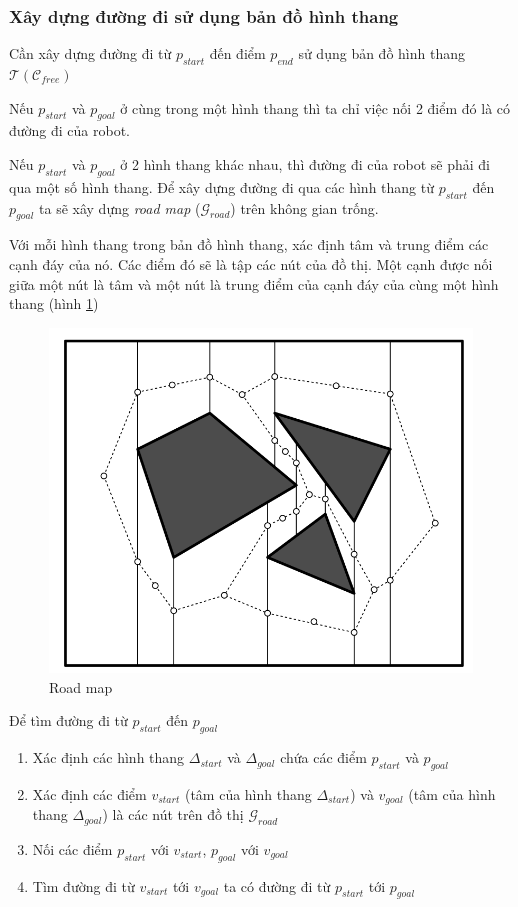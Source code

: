 \documentclass[a4paper,12pt]{report}
\begin{document}
\subsubsection{Xây dựng đường đi sử dụng bản đồ hình thang}
Cần xây dựng đường đi từ $p_{start}$ đến điểm $p_{end}$ sử dụng bản đồ hình thang $\mathcal{T}(\mathcal{C}_{free})$
\par Nếu $p_{start}$ và $p_{goal}$ ở cùng trong một hình thang thì ta chỉ việc nối 2 điểm đó là có đường đi của robot.
\par Nếu $p_{start}$ và $p_{goal}$ ở 2 hình thang khác nhau, thì đường đi của robot sẽ phải đi qua một số hình thang. Để xây dựng đường đi qua các hình thang từ $p_{start}$ đến $p_{goal}$ ta sẽ xây dựng \emph{road map} ($\mathcal{G}_{road}$) trên không gian trống. 
\par Với mỗi hình thang trong bản đồ hình thang, xác định tâm và trung điểm các cạnh đáy của nó. Các điểm đó sẽ là tập các nút của đồ thị. Một cạnh được nối giữa một nút là tâm và một nút là trung điểm của cạnh đáy của cùng một hình thang (hình \ref{road_map})
\begin{figure}[H]
\centering
\label{road_map}
\includegraphics[scale=0.25]{road_map.png}
\caption{Road map}
\end{figure}

\par Để tìm đường đi từ $p_{start}$ đến $p_{goal}$
\begin{enumerate}
\item Xác định các hình thang $\Delta_{start}$ và $\Delta_{goal}$ chứa các điểm $p_{start}$ và $p_{goal}$
\item Xác định các điểm $v_{start}$ (tâm của hình thang $\Delta_{start}$) và $v_{goal}$ (tâm của hình thang $\Delta_{goal}$) là các nút trên đồ thị $\mathcal{G}_{road}$
\item Nối các điểm $p_{start}$ với $v_{start}$, $p_{goal}$ với $v_{goal}$
\item Tìm đường đi từ $v_{start}$ tới $v_{goal}$ ta có đường đi từ $p_{start}$ tới $p_{goal}$
\end{enumerate}
\end{document}
